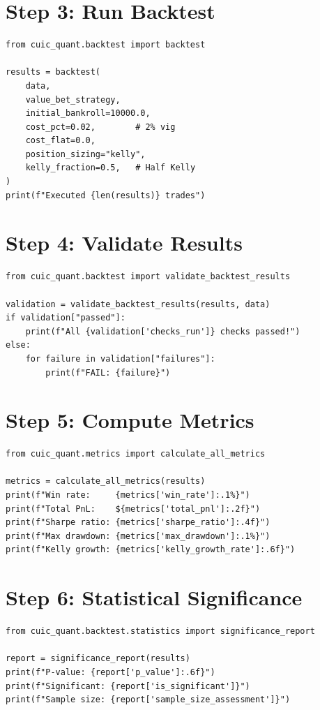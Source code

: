 \documentclass[12pt,a4paper]{report}
\theoremstyle{definition}
\begin{document}
\section{Step 3: Run Backtest}

\begin{lstlisting}[caption={Running the backtest.}]
from cuic_quant.backtest import backtest

results = backtest(
    data,
    value_bet_strategy,
    initial_bankroll=10000.0,
    cost_pct=0.02,        # 2% vig
    cost_flat=0.0,
    position_sizing="kelly",
    kelly_fraction=0.5,   # Half Kelly
)
print(f"Executed {len(results)} trades")
\end{lstlisting}

\section{Step 4: Validate Results}

\begin{lstlisting}[caption={Running the 12-check validator.}]
from cuic_quant.backtest import validate_backtest_results

validation = validate_backtest_results(results, data)
if validation["passed"]:
    print(f"All {validation['checks_run']} checks passed!")
else:
    for failure in validation["failures"]:
        print(f"FAIL: {failure}")
\end{lstlisting}

\section{Step 5: Compute Metrics}

\begin{lstlisting}[caption={Computing all performance metrics.}]
from cuic_quant.metrics import calculate_all_metrics

metrics = calculate_all_metrics(results)
print(f"Win rate:     {metrics['win_rate']:.1%}")
print(f"Total PnL:    ${metrics['total_pnl']:.2f}")
print(f"Sharpe ratio: {metrics['sharpe_ratio']:.4f}")
print(f"Max drawdown: {metrics['max_drawdown']:.1%}")
print(f"Kelly growth: {metrics['kelly_growth_rate']:.6f}")
\end{lstlisting}

\section{Step 6: Statistical Significance}

\begin{lstlisting}[caption={Testing statistical significance.}]
from cuic_quant.backtest.statistics import significance_report

report = significance_report(results)
print(f"P-value: {report['p_value']:.6f}")
print(f"Significant: {report['is_significant']}")
print(f"Sample size: {report['sample_size_assessment']}")
\end{lstlisting}
\end{document}

